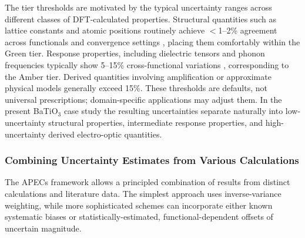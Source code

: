 \documentclass[prb,twocolumn,superscriptaddress,amsmath,amssymb,longbibliography]{revtex4-2}
\begin{document}
The tier thresholds are motivated by the typical uncertainty
ranges across different classes of DFT-calculated properties. Structural 
quantities such as lattice constants and atomic positions routinely achieve 
$<$1--2\% agreement across functionals and convergence 
settings \cite{Lejaeghere2016}, placing them comfortably within the Green tier.
Response properties, including dielectric tensors and phonon frequencies typically 
show 5--15\% cross-functional variations \cite{Ghosez1999,Wahl2008}, corresponding to the Amber tier.
Derived 
quantities involving amplification or approximate physical models generally 
exceed 15\%. 
These thresholds are defaults, not universal prescriptions; 
domain-specific applications may adjust them. In the present BaTiO$_3$ case study the resulting uncertainties separate naturally into low-uncertainty structural properties, intermediate response properties, and high-uncertainty derived electro-optic quantities.

\subsubsection{Combining Uncertainty Estimates from Various Calculations}
\label{sec:normalization}

The APECs framework allows a principled combination of results from distinct calculations and literature data. The simplest approach uses inverse-variance weighting, while more sophisticated schemes can incorporate either known systematic biases or statistically-estimated, functional-dependent offsets of uncertain magnitude. 
\end{document}
